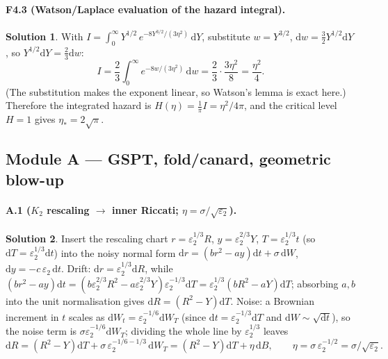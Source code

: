 \documentclass[11pt]{article}
\newcommand{\ep}{\varepsilon_2}
\newcommand{\dd}{\mathrm{d}}
\theoremstyle{definition}
\newtheorem*{sol}{Solution}
\begin{document}
\paragraph{F4.3 (Watson/Laplace evaluation of the hazard integral).}
\begin{sol}
With $I=\displaystyle\int_0^\infty Y^{1/2}\,e^{-8Y^{3/2}/(3\eta^2)}\,\dd Y$, substitute
$w=Y^{3/2}$, $\dd w=\tfrac32 Y^{1/2}\dd Y$, so $Y^{1/2}\dd Y=\tfrac23\dd w$:
\[
I=\frac23\int_0^\infty e^{-8w/(3\eta^2)}\,\dd w=\frac23\cdot\frac{3\eta^2}{8}=\frac{\eta^2}{4}.
\]
(The substitution makes the exponent linear, so Watson's lemma is exact here.) Therefore the
integrated hazard is $H(\eta)=\tfrac1\pi I=\eta^2/4\pi$, and the critical level $H=1$ gives
$\eta_*=2\sqrt\pi$.
\end{sol}

\subsection*{Module A --- GSPT, fold/canard, geometric blow-up}

\paragraph{A.1 ($K_2$ rescaling $\to$ inner Riccati; $\eta=\sigma/\sqrt{\ep}$).}
\begin{sol}
Insert the rescaling chart $r=\ep^{1/3}R$, $y=\ep^{2/3}Y$, $T=\ep^{1/3}t$ (so
$\dd T=\ep^{1/3}\dd t$) into the noisy normal form $\dd r=(b r^2-a y)\dd t+\sigma\,\dd W$,
$\dd y=-c\,\ep\,\dd t$. Drift: $\dd r=\ep^{1/3}\dd R$, while
$(br^2-ay)\dd t=(b\ep^{2/3}R^2-a\ep^{2/3}Y)\ep^{-1/3}\dd T=\ep^{1/3}(bR^2-aY)\dd T$; absorbing
$a,b$ into the unit normalisation gives $\dd R=(R^2-Y)\dd T$. Noise: a Brownian increment in
$t$ scales as $\dd W_t=\ep^{-1/6}\dd W_T$ (since $\dd t=\ep^{-1/3}\dd T$ and $\dd W\sim\sqrt{\dd t}$),
so the noise term is $\sigma\ep^{-1/6}\dd W_T$; dividing the whole line by $\ep^{1/3}$ leaves
\[
\dd R=(R^2-Y)\dd T+\sigma\,\ep^{-1/6-1/3}\,\dd W_T=(R^2-Y)\dd T+\eta\,\dd B,\qquad
\eta=\sigma\,\ep^{-1/2}=\sigma/\sqrt{\ep}.
\]
\end{sol}
\end{document}
